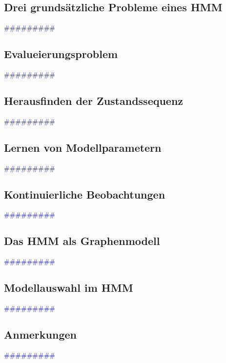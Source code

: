 \documentclass{article}
\begin{document}
  \subsection{Drei grundsätzliche Probleme eines HMM} %
      \textcolor{blue}{\#\#\#\#\#\#\#\#\#}
  \subsection{Evalueierungsproblem} %
      \textcolor{blue}{\#\#\#\#\#\#\#\#\#}
  \subsection{Herausfinden der Zustandssequenz} %
      \textcolor{blue}{\#\#\#\#\#\#\#\#\#}
  \subsection{Lernen von Modellparametern} %
      \textcolor{blue}{\#\#\#\#\#\#\#\#\#}
  \subsection{Kontinuierliche Beobachtungen} %
      \textcolor{blue}{\#\#\#\#\#\#\#\#\#}
  \subsection{Das HMM als Graphenmodell} %
      \textcolor{blue}{\#\#\#\#\#\#\#\#\#}
  \subsection{Modellauswahl im HMM} %
      \textcolor{blue}{\#\#\#\#\#\#\#\#\#}
  \subsection{Anmerkungen} %
      \textcolor{blue}{\#\#\#\#\#\#\#\#\#}
\end{document}
